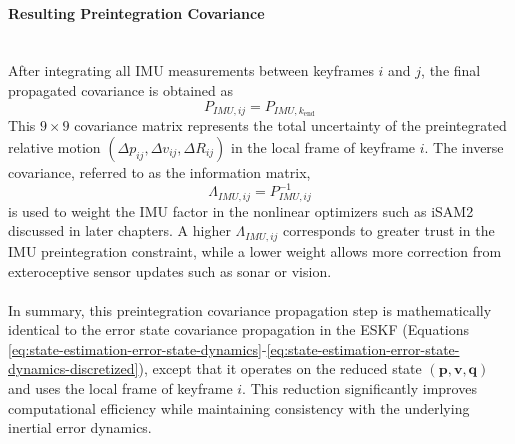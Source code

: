 \paragraph{Resulting Preintegration Covariance} \mbox{}\\[0.5em] \noindent
After integrating all IMU measurements between keyframes $i$ and $j$, the final propagated covariance is obtained as
$$
    P_{IMU,ij} = P_{IMU,k_{\text{end}}}
$$
This $9\times9$ covariance matrix represents the total uncertainty of the preintegrated relative motion $(\Delta p_{ij}, \Delta v_{ij}, \Delta R_{ij})$ in the local frame of keyframe $i$. The inverse covariance, referred to as the information matrix,
$$
    \Lambda_{IMU,ij} = P_{IMU,ij}^{-1}
$$
is used to weight the IMU factor in the nonlinear optimizers such as iSAM2 discussed in later chapters. A higher $\Lambda_{IMU,ij}$ corresponds to greater trust in the IMU preintegration constraint, while a lower weight allows more correction from exteroceptive sensor updates such as sonar or vision.  
\\ \\
In summary, this preintegration covariance propagation step is mathematically identical to the error state covariance propagation in the ESKF (Equations \ref{eq:state-estimation-error-state-dynamics}-\ref{eq:state-estimation-error-state-dynamics-discretized}), except that it operates on the reduced state $(\mathbf{p}, \mathbf{v}, \mathbf{q})$ and uses the local frame of keyframe $i$. This reduction significantly improves computational efficiency while maintaining consistency with the underlying inertial error dynamics.




